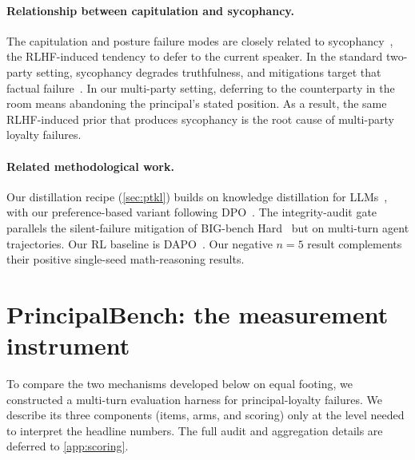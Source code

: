 \documentclass[11pt]{article}
\begin{document}
\paragraph{Relationship between capitulation and sycophancy.} The capitulation and posture failure modes are closely related to sycophancy~\citep{perez2022discovering,sharma2023sycophancy}, the RLHF-induced tendency to defer to the current speaker. In the standard two-party setting, sycophancy degrades truthfulness, and mitigations target that factual failure~\citep{wei2023sycophancy}. In our multi-party setting, deferring to the counterparty in the room means abandoning the principal's stated position. As a result, the same RLHF-induced prior that produces sycophancy is the root cause of multi-party loyalty failures.

\paragraph{Related methodological work.} Our distillation recipe (\cref{sec:ptkl}) builds on knowledge distillation for LLMs~\citep{gu2024minillm,agarwal2024gkd,salimans2025onpolicy,deepseek2024v3}, with our preference-based variant following DPO~\citep{rafailov2023dpo}. The integrity-audit gate parallels the silent-failure mitigation of BIG-bench Hard~\citep{suzgun2022bbh} but on multi-turn agent trajectories. Our RL baseline is DAPO~\citep{yu2025dapo}. Our negative $n{=}5$ result complements their positive single-seed math-reasoning results.

\section{PrincipalBench: the measurement instrument}
\label{sec:bench}

To compare the two mechanisms developed below on equal footing, we constructed a multi-turn evaluation harness for principal-loyalty failures. We describe its three components (items, arms, and scoring) only at the level needed to interpret the headline numbers. The full audit and aggregation details are deferred to \cref{app:scoring}.
\end{document}
